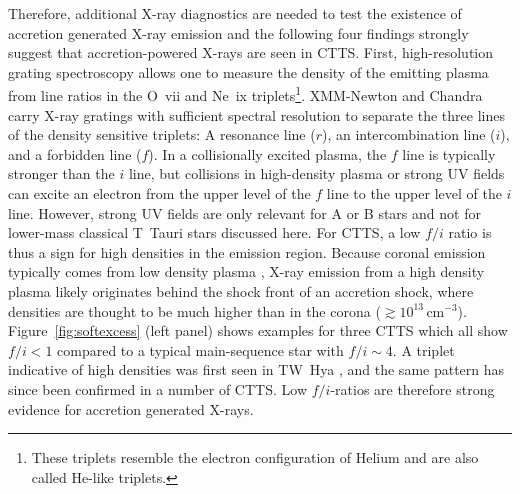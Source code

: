 \documentclass[graybox, nosecnum]{svmult}
\begin{document}
Therefore, additional X-ray diagnostics are needed to test the existence of accretion generated X-ray emission and the following four findings strongly suggest that accretion-powered X-rays are seen in CTTS. First, high-resolution grating spectroscopy allows one to measure the density of the emitting plasma from line ratios in the O~{\sc vii} and Ne~{\sc ix} triplets\footnote{These triplets resemble the electron configuration of Helium and are also called He-like triplets.}. XMM-Newton and Chandra carry X-ray gratings with sufficient spectral resolution to separate the three lines of the density sensitive triplets: A resonance line ($r$), an intercombination line ($i$), and a forbidden line ($f$). In a collisionally excited plasma, the $f$ line is typically stronger than the $i$ line, but collisions in high-density plasma or strong UV fields can excite an electron from the upper level of the $f$ line to the upper level of the $i$ line. However, strong UV fields are only relevant for A or B stars and not for lower-mass classical T~Tauri stars discussed here. For CTTS, a low $f/i$ ratio is thus a sign for high densities in the emission region. Because coronal emission typically comes from low density plasma \citep[$n_e\lesssim10^{10}$\,cm$^{-3}$, e.g.,][]{Ness_2002}, X-ray emission from a high density plasma likely originates behind the shock front of an accretion shock, where densities are thought to be much higher than in the corona ($\gtrsim10^{13}$\,cm$^{-3}$). Figure~\ref{fig:softexcess} (left panel) shows examples for three CTTS which all show $f/i < 1$ compared to a typical main-sequence star with $f/i\sim 4$. A triplet indicative of high densities was first seen in TW~Hya \cite{Kastner_2002}, and the same pattern has since been confirmed in a number of CTTS. Low $f/i$-ratios are therefore strong evidence for accretion generated X-rays.
\end{document}
